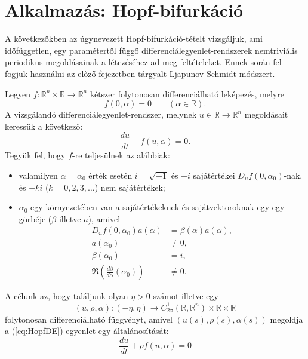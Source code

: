 \documentclass[oneside, titlepage, 12pt, a4paper]{report}
\begin{document}
\section{Alkalmazás: Hopf-bifurkáció}
\label{sec:Hopfbifurcation}
A következőkben az úgynevezett Hopf-bifurkáció-tételt vizsgáljuk, ami időfüggetlen, egy paramétertől függő differenciálegyenlet-rendszerek nemtriviális periodikus megoldásainak a létezéséhez ad meg feltételeket. Ennek során fel fogjuk használni az előző fejezetben tárgyalt Ljapunov-Schmidt-módszert. \cite{chapter2chapter10} \par
Legyen $f : \mathbb{R}^n \times \mathbb{R} \rightarrow \mathbb{R}^n$ kétszer folytonosan differenciálható leképezés, melyre
\begin{equation*}
f(0, \alpha) = 0 \qquad (\alpha \in \mathbb{R}).
\end{equation*}
A vizsgálandó differenciálegyenlet-rendszer, melynek $u \in \mathbb{R} \rightarrow \mathbb{R}^n$ megoldásait keressük a következő:
\begin{equation}
\label{eq:HopfDE}
\frac{du}{dt} + f(u, \alpha) = 0.
\end{equation}
Tegyük fel, hogy $f$-re teljesülnek az alábbiak:
\begin{itemize}
\item
valamilyen $\alpha = \alpha_0$ érték esetén $i = \sqrt{-1}$ és $-i$ sajátértékei $D_uf(0, \alpha_0)$-nak, és $\pm ki$ ($k = 0, 2, 3, \dots$) nem sajátértékek;
\item
$\alpha_0$ egy környezetében van a sajátértékeknek és sajátvektoroknak egy-egy görbéje ($\beta$ illetve $a$), amivel
\begin{align}
D_uf(0, \alpha_0) a(\alpha) &= \beta(\alpha) a(\alpha), \\
a(\alpha_0) &\ne 0, \\
\beta(\alpha_0) &= i, \\
\Re(\frac{d\beta}{d\alpha}(\alpha_0)) &\ne 0.
\end{align}
\end{itemize}
A célunk az, hogy találjunk olyan $\eta > 0$ számot illetve egy
\begin{equation*}
(u, \rho, \alpha) : (-\eta, \eta) \rightarrow C_{2\pi}^1(\mathbb{R}, \mathbb{R}^n) \times \mathbb{R} \times \mathbb{R}
\end{equation*}
folytonosan differenciálható függvényt, amivel $(u(s), \rho(s), \alpha(s))$ megoldja a (\ref{eq:HopfDE}) egyenlet egy általánosítását:
\begin{equation}
\label{eq:HopfDErho}
\frac{du}{dt} + \rho f(u, \alpha) = 0
\end{equation}
\end{document}
